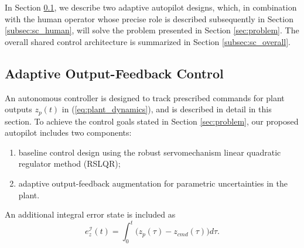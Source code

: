 \documentclass[english]{ifacconf}
\begin{document}
In Section \ref{subsec:sc_adaptive}, we describe two adaptive autopilot designs, which, in combination with the human operator whose precise role is described subsequently in Section \ref{subsec:sc_human}, will solve the problem presented in Section \ref{sec:problem}. The overall shared control architecture is summarized in Section \ref{subsec:sc_overall}.


\subsection{Adaptive Output-Feedback Control}\label{subsec:sc_adaptive}
An autonomous controller is designed to track prescribed commands for plant outputs $z_p(t)$ in (\ref{eq:plant_dynamics}), and is described in detail in this section. %
To achieve the control goals stated in Section \ref{sec:problem}, our proposed autopilot includes two components:
\begin{enumerate}[label=(\roman*)]
	\item baseline control design using the robust servomechanism linear quadratic regulator method (RSLQR);
	\item adaptive output-feedback augmentation for parametric uncertainties in the plant.
\end{enumerate}

An additional integral error state is included as
\begin{equation}
	e_z^{\mathcal{I}}(t) = \int_0^{t} \big( z_p(\tau) - z_{cmd}(\tau)\big) d\tau.
\end{equation}
\end{document}
